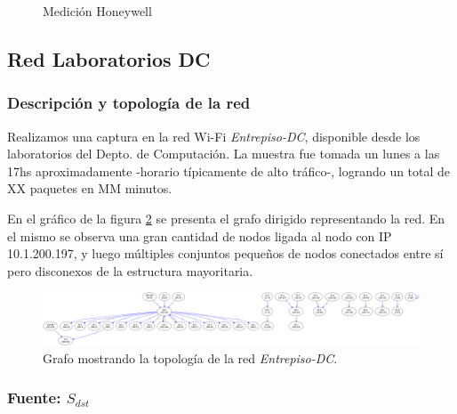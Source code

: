 \documentclass[10pt, a4paper]{article}
\begin{document}
\begin{figure}[H]
\begin{minipage}{0.5\linewidth}
     \caption{Medición Honeywell}\label{fig:Honeywell-src-	info}
   \end{minipage}
 \end{figure}

\subsection{Red Laboratorios DC}

\subsubsection{Descripción y topología de la red}

Realizamos una captura en la red Wi-Fi \emph{Entrepiso-DC}, disponible desde los laboratorios del Depto. de Computación. La muestra fue tomada un lunes a las 17hs aproximadamente -horario típicamente de alto tráfico-, logrando un total de XX paquetes en MM minutos.

En el gráfico de la figura \ref{fig:entrepiso-dc-grafo} se presenta el grafo dirigido representando la red. En el mismo se observa una gran cantidad de nodos ligada al nodo con IP 10.1.200.197, y luego múltiples conjuntos pequeños de nodos conectados entre sí pero disconexos de la estructura mayoritaria.

\begin{figure}[H]
  \begin{center}
    \includegraphics[width=0.8\linewidth]{../imgs/entrepiso-dc-ips_red.png}
    \caption{Grafo mostrando la topología de la red \emph{Entrepiso-DC}.}
    \label{fig:entrepiso-dc-grafo}
  \end{center}
\end{figure}

\subsubsection{Fuente: $S_{dst}$}
\end{document}
